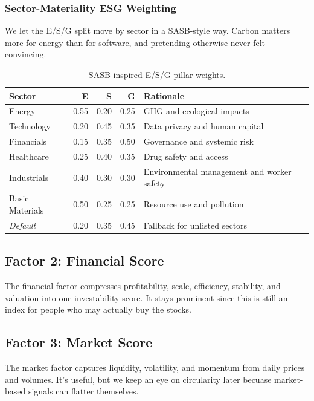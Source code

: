 \subsubsection{Sector-Materiality ESG Weighting}
\label{sec:sasb_materiality}
We let the E/S/G split move by sector in a SASB-style way. Carbon matters more for energy than for software, and pretending otherwise never felt convincing.
\begin{table}[!htbp]
\centering
\caption{SASB-inspired E/S/G pillar weights.}\label{tab:sasb_weights}\small
\begin{tabular}{@{}lrrrl@{}}
\toprule
\textbf{Sector} & \textbf{E} & \textbf{S} & \textbf{G} & \textbf{Rationale} \\
\midrule
Energy & 0.55 & 0.20 & 0.25 & GHG and ecological impacts \\
Technology & 0.20 & 0.45 & 0.35 & Data privacy and human capital \\
Financials & 0.15 & 0.35 & 0.50 & Governance and systemic risk \\
Healthcare & 0.25 & 0.40 & 0.35 & Drug safety and access \\
Industrials & 0.40 & 0.30 & 0.30 & Environmental management and worker safety \\
Basic Materials & 0.50 & 0.25 & 0.25 & Resource use and pollution \\
\emph{Default} & 0.20 & 0.35 & 0.45 & Fallback for unlisted sectors \\
\bottomrule
\end{tabular}
\end{table}

\subsection{Factor 2: Financial Score}
\label{sec:financial_score}
The financial factor compresses profitability, scale, efficiency, stability, and valuation into one investability score. It stays prominent since this is still an index for people who may actually buy the stocks.
\subsection{Factor 3: Market Score}
\label{sec:market_score}
The market factor captures liquidity, volatility, and momentum from daily prices and volumes. It's useful, but we keep an eye on circularity later becuase market-based signals can flatter themselves.
